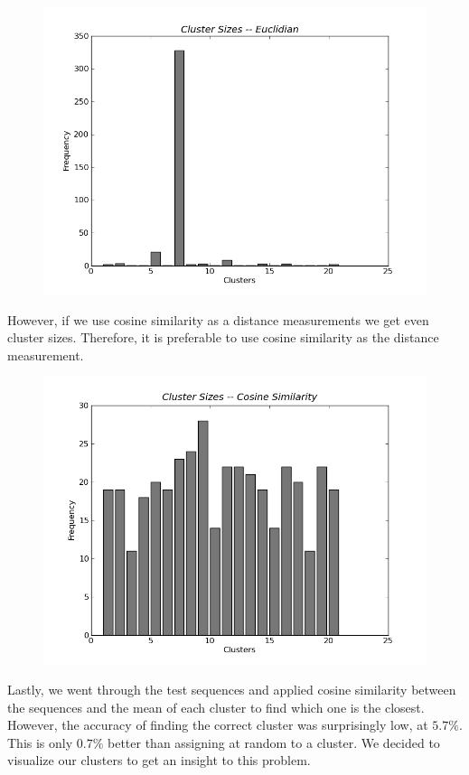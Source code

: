 \begin{figure}[H]
  \includegraphics[width=\linewidth]{./figs/euclidian.png}
  \label{fig:euclidian}
\end{figure}

However, if we use cosine similarity as a distance measurements we get even
cluster sizes. Therefore, it is preferable to use cosine similarity as
the distance measurement.

\begin{figure}[H]
  \includegraphics[width=\linewidth]{./figs/cosine.png}
  \label{fig:cosine}
\end{figure}

Lastly, we went through the test sequences and applied cosine similarity between
the sequences and the mean of each cluster to find which one is the closest. However,
the accuracy of finding the correct cluster was surprisingly low, at $5.7\%$. This is only
$0.7\%$ better than assigning at random to a cluster. We decided to visualize our clusters
to get an insight to this problem.

